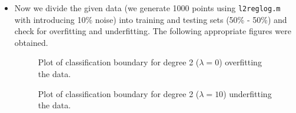 \documentclass{article}
\begin{document}
\begin{itemize}
 \item Now we divide the given data (we generate 1000 points using \verb|l2reglog.m| with introducing 10\% noise) into training and testing sets (50\% - 50\%) and check for overfitting and underfitting. The following appropriate figures were obtained.
 
     \begin{figure}[H]
 \caption{Plot of classification boundary for degree 2 ($\lambda=0$) overfitting the data.}
 \label{fig:13}
 \end{figure}
     \begin{figure}[H]
 \caption{Plot of classification boundary for degree 2 ($\lambda=10$) underfitting the data.}
 \label{fig:14}
 \end{figure}
\end{itemize}
\end{document}
